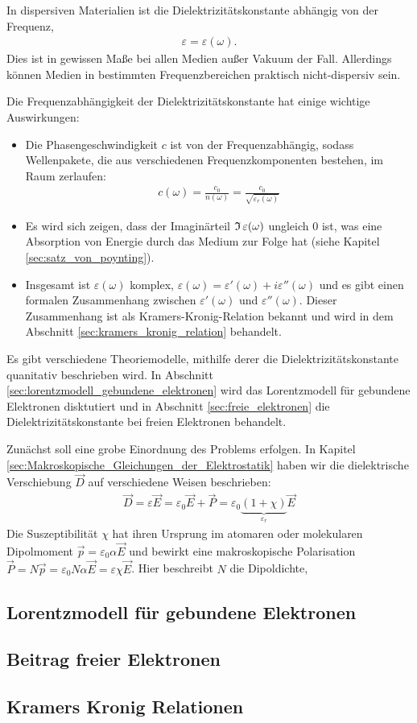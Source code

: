 In dispersiven Materialien ist die Dielektrizitätskonstante abhängig von der Frequenz,
\begin{align*}
    \varepsilon=\varepsilon(\omega).
\end{align*}
Dies ist in gewissen Maße bei allen Medien außer Vakuum der Fall. Allerdings können Medien in bestimmten Frequenzbereichen praktisch nicht-dispersiv sein.

Die Frequenzabhängigkeit der Dielektrizitätskonstante hat einige wichtige Auswirkungen:
\begin{itemize}
    \item Die Phasengeschwindigkeit $c$ ist von der Frequenzabhängig, sodass Wellenpakete, die aus verschiedenen Frequenzkomponenten bestehen, im Raum zerlaufen:
     \begin{align*}
              c(\omega) = \frac{c_0}{n(\omega)} = \frac{c_0}{\sqrt{\varepsilon_r(\omega)}}
          \end{align*}
    \item Es wird sich zeigen, dass der Imaginärteil $\operatorname{\mathfrak{I}}\varepsilon(\omega)$ ungleich 0 ist, was eine Absorption von Energie durch das Medium zur Folge hat (siehe Kapitel \ref{sec:satz_von_poynting}). 
    \item Insgesamt ist $\varepsilon(\omega)$ komplex, $\varepsilon(\omega) = \varepsilon'(\omega) + i\varepsilon''(\omega)$ und es gibt einen formalen Zusammenhang zwischen $\varepsilon'(\omega)$ und $\varepsilon''(\omega)$. Dieser Zusammenhang ist als Kramers-Kronig-Relation bekannt und wird in dem Abschnitt \ref{sec:kramers_kronig_relation} behandelt. 
\end{itemize}

Es gibt verschiedene Theoriemodelle, mithilfe derer die Dielektrizitätskonstante quanitativ beschrieben wird. 
In Abschnitt \ref{sec:lorentzmodell_gebundene_elektronen} wird das Lorentzmodell für gebundene Elektronen disktutiert und in Abschnitt \ref{sec:freie_elektronen} die Dielektrizitätskonstante bei freien Elektronen behandelt. 


Zunächst soll eine grobe Einordnung des Problems erfolgen. 
In Kapitel \ref{sec:Makroskopische_Gleichungen_der_Elektrostatik} haben wir die dielektrische Verschiebung $\vec D$ auf verschiedene Weisen beschrieben:
\begin{align*}
    \vec D= \varepsilon \vec E=\varepsilon_0 \vec E+\vec P=\varepsilon_0 \underbrace{(1+\chi)}_{\varepsilon _r }\vec E
\end{align*}
Die Suszeptibilität $\chi$ hat ihren Ursprung im atomaren oder molekularen Dipolmoment $\vec p=\varepsilon_0 \alpha\vec E$ und bewirkt eine makroskopische Polarisation 
$\vec P=N\vec p = \varepsilon_0 N\alpha\vec E = \varepsilon\chi\vec E$. Hier beschreibt $N$ die Dipoldichte, 



\subsection{Lorentzmodell für gebundene Elektronen\label{sec:lorentzmodell_gebundene_elektronen}}
\subsection{Beitrag freier Elektronen\label{sec:freie_elektronen}}
\subsection{Kramers Kronig Relationen\label{sec:kramers_kronig_relation}}